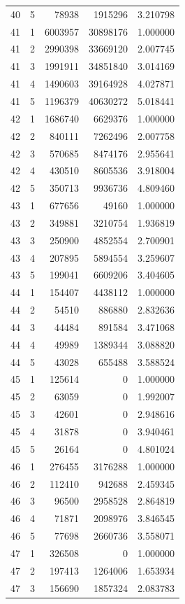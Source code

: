 \begin{longtable}{rrrrr}
40 & 5 & 78938 & 1915296 & 3.210798 \\
41 & 1 & 6003957 & 30898176 & 1.000000 \\
41 & 2 & 2990398 & 33669120 & 2.007745 \\
41 & 3 & 1991911 & 34851840 & 3.014169 \\
41 & 4 & 1490603 & 39164928 & 4.027871 \\
41 & 5 & 1196379 & 40630272 & 5.018441 \\
42 & 1 & 1686740 & 6629376 & 1.000000 \\
42 & 2 & 840111 & 7262496 & 2.007758 \\
42 & 3 & 570685 & 8474176 & 2.955641 \\
42 & 4 & 430510 & 8605536 & 3.918004 \\
42 & 5 & 350713 & 9936736 & 4.809460 \\
43 & 1 & 677656 & 49160 & 1.000000 \\
43 & 2 & 349881 & 3210754 & 1.936819 \\
43 & 3 & 250900 & 4852554 & 2.700901 \\
43 & 4 & 207895 & 5894554 & 3.259607 \\
43 & 5 & 199041 & 6609206 & 3.404605 \\
44 & 1 & 154407 & 4438112 & 1.000000 \\
44 & 2 & 54510 & 886880 & 2.832636 \\
44 & 3 & 44484 & 891584 & 3.471068 \\
44 & 4 & 49989 & 1389344 & 3.088820 \\
44 & 5 & 43028 & 655488 & 3.588524 \\
45 & 1 & 125614 & 0 & 1.000000 \\
45 & 2 & 63059 & 0 & 1.992007 \\
45 & 3 & 42601 & 0 & 2.948616 \\
45 & 4 & 31878 & 0 & 3.940461 \\
45 & 5 & 26164 & 0 & 4.801024 \\
46 & 1 & 276455 & 3176288 & 1.000000 \\
46 & 2 & 112410 & 942688 & 2.459345 \\
46 & 3 & 96500 & 2958528 & 2.864819 \\
46 & 4 & 71871 & 2098976 & 3.846545 \\
46 & 5 & 77698 & 2660736 & 3.558071 \\
47 & 1 & 326508 & 0 & 1.000000 \\
47 & 2 & 197413 & 1264006 & 1.653934 \\
47 & 3 & 156690 & 1857324 & 2.083783 \\

\end{longtable}
